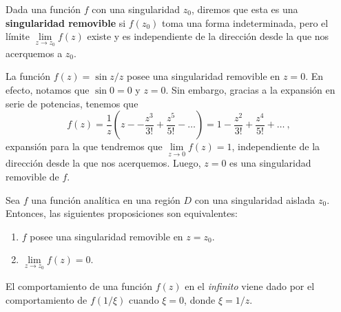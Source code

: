 \begin{defi}
    Dada una función $f$ con una singularidad $z_0$, diremos que esta es una \textbf{singularidad removible} si $f(z_0)$ toma una forma indeterminada, pero el límite $\lim\limits_{z \to z_0} f(z)$ existe y es independiente de la dirección desde la que nos acerquemos a $z_0$.
\end{defi}

\begin{ejemplo}
    La función $f(z) = \sin z/z$ posee una singularidad removible en $z=0$. En efecto, notamos que $\sin 0 = 0$ y $z = 0$. Sin embargo, gracias a la expansión en serie de potencias, tenemos que 
    \begin{equation*}
        f(z) = \frac{1}{z} \left( z - - \frac{z^3}{3!} + \frac{z^5}{5!} - \dots  \right) = 1 - \frac{z^2}{3!} + \frac{z^4}{5!} + \dots \ ,
    \end{equation*}
    expansión para la que tendremos que $\lim\limits_{z \to 0} f(z) = 1$, independiente de la dirección desde la que nos acerquemos. Luego, $z=0$ es una singularidad removible de $f$.
\end{ejemplo}

\begin{teorema}
    Sea $f$ una función analítica en una región $D$ con una singularidad aislada $z_0$. Entonces, las siguientes proposiciones son equivalentes:
    \begin{enumerate}
        \item $f$ posee una singularidad removible en $z = z_0$.
        \item $\lim\limits_{z \to z_0} f(z) = 0$.
    \end{enumerate}
\end{teorema}

\begin{defi}
    El comportamiento de una función $f(z)$ en el \emph{infinito} viene dado por el comportamiento de $f(1/\xi)$ cuando $\xi = 0$, donde $\xi = 1/z$.
\end{defi}

